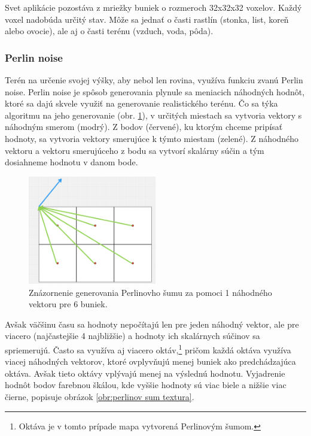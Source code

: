 \documentclass[12pt]{article}
\begin{document}
Svet aplikácie pozostáva z mriežky buniek o rozmeroch 32x32x32 voxelov.
Každý voxel nadobúda určitý stav. Môže sa jednať o časti rastlín (stonka, list,
koreň alebo ovocie), ale aj o časti terénu (vzduch, voda, pôda).

\subsubsection{Perlin noise}

Terén na určenie svojej výšky, aby nebol len rovina, využíva funkciu zvanú
Perlin noise. Perlin noise je spôsob generovania plynule sa meniacich náhodných
hodnôt, ktoré sa dajú skvele využiť na generovanie realistického terénu.
Čo sa týka algoritmu na jeho generovanie (obr. \ref{obr:perlinov sum}),
v určitých miestach sa vytvoria
vektory s náhodným smerom (modrý). Z bodov (červené), ku ktorým chceme pripísať
hodnoty, sa vytvoria vektory smerujúce k týmto miestam (zelené). Z náhodného
vektoru a vektoru smerujúceho z bodu sa vytvorí skalárny súčin a tým dosiahneme
hodnotu v danom bode.

\begin{figure}[ht]
	\centering
	\includegraphics[width=0.5\textwidth]{res/prelinov_sum.png}
	\caption{Znázornenie generovania Perlinovho šumu za pomoci 1 náhodného
		vektoru pre 6 buniek.}
	\label{obr:perlinov sum}
\end{figure}

Avšak väčšinu času sa hodnoty nepočítajú len pre jeden náhodný vektor,
ale pre viacero (najčastejšie 4 najbližšie) a hodnoty ich skalárnych súčinov
sa spriemerujú. Často sa využíva aj viacero oktáv,\footnote{
	Oktáva je v tomto prípade mapa vytvorená Perlinovým šumom.
} pričom každá oktáva využíva
viacej náhodných vektorov, ktoré ovplyvňujú menej buniek ako predchádzajúca
oktáva. Avšak tieto oktávy vplývajú menej na výslednú hodnotu. Vyjadrenie hodnôt bodov
farebnou škálou, kde vyššie hodnoty sú viac biele a nižšie viac čierne, popisuje
obrázok \ref{obr:perlinov sum textura}.
\end{document}
